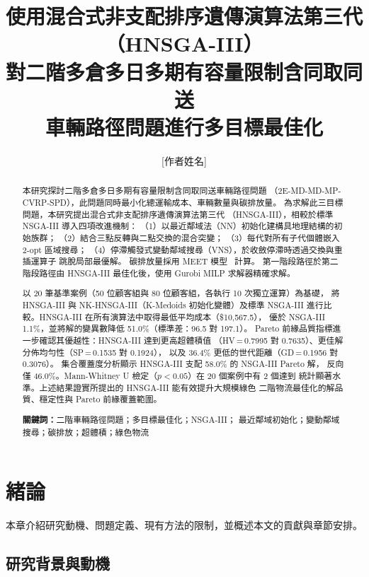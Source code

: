 \documentclass[11pt, a4paper]{article}
\title{\textbf{使用混合式非支配排序遺傳演算法第三代（HNSGA-III）\\
對二階多倉多日多期有容量限制含同取同送\\
車輛路徑問題進行多目標最佳化}}
\author{[作者姓名]}
\date{}
\numberwithin{equation}{section}
\begin{document}
\maketitle
\thispagestyle{fancy}

\begin{abstract}
本研究探討二階多倉多日多期有容量限制含同取同送車輛路徑問題
（2E-MD-MD-MP-CVRP-SPD），此問題同時最小化總運輸成本、車輛數量與碳排放量。
為求解此三目標問題，本研究提出混合式非支配排序遺傳演算法第三代
（HNSGA-III），相較於標準 NSGA-III 導入四項改進機制：
（1）以最近鄰域法（NN）初始化建構具地理結構的初始族群；
（2）結合三點反轉與二點交換的混合突變；
（3）每代對所有子代個體嵌入 2-opt 區域搜尋；
（4）停滯觸發式變動鄰域搜尋（VNS），於收斂停滯時透過交換與重插運算子
跳脫局部最優解。
碳排放量採用 MEET 模型~\cite{hickman1999} 計算。
第一階段路徑於第二階段路徑由 HNSGA-III 最佳化後，使用 Gurobi MILP
求解器精確求解。

以 20 筆基準案例（50 位顧客組與 80 位顧客組，各執行 10 次獨立運算）為基礎，
將 HNSGA-III 與 NK-HNSGA-III（K-Medoids 初始化變體）及標準 NSGA-III
進行比較。HNSGA-III 在所有演算法中取得最低平均成本（\$10{,}567.5），
優於 NSGA-III 1.1\%，並將解的變異數降低 51.0\%（標準差：96.5 對 197.1）。
Pareto 前緣品質指標進一步確認其優越性：HNSGA-III 達到更高超體積值
（HV\,=\,0.7995 對 0.7635）、更佳解分佈均勻性（SP\,=\,0.1535 對 0.1924），
以及 36.4\% 更低的世代距離（GD\,=\,0.1956 對 0.3076）。
集合覆蓋度分析顯示 HNSGA-III 支配 58.0\% 的 NSGA-III Pareto 解，
反向僅 46.0\%。Mann-Whitney U 檢定（$p<0.05$）在 20 個案例中有 2 個達到
統計顯著水準。上述結果證實所提出的 HNSGA-III 能有效提升大規模綠色
二階物流最佳化的解品質、穩定性與 Pareto 前緣覆蓋範圍。

\medskip
\noindent\textbf{關鍵詞：}二階車輛路徑問題；多目標最佳化；NSGA-III；
最近鄰域初始化；變動鄰域搜尋；碳排放；超體積；綠色物流
\end{abstract}

\section{緒論}
\label{sec:intro}

本章介紹研究動機、問題定義、現有方法的限制，並概述本文的貢獻與章節安排。

\subsection{研究背景與動機}
\end{document}
